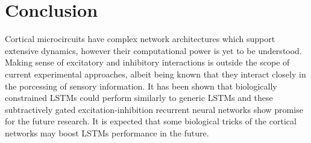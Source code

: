 \section{Conclusion}
%
Cortical microcircuits have complex network architectures which support extensive dynamics, however their computational power is yet to be understood. Making sense of excitatory and inhibitory interactions is outside the scope of current experimental approaches, albeit being known that they interact closely in the porcessing of sensory information. It has been shown that biologically constrained LSTMs could perform similarly to generic LSTMs and these subtractively gated excitation-inhibition recurrent neural networks show promise for the future research. It is expected that some biological tricks of the cortical networks may boost LSTMs performance in the future.